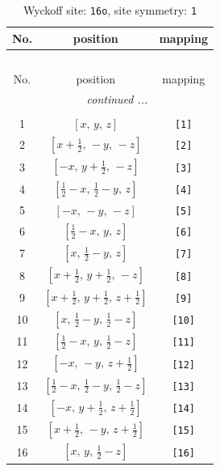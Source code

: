 \documentclass[fleqn,8pt]{jsarticle}
\begin{document}
\begin{longtable}{ccc}
\caption{Wyckoff site: {\tt 16o}, site symmetry: {\tt 1}}
 \\
 \hline \hline
No. & position & mapping \\ \hline \endfirsthead

\multicolumn{2}{l}{\tablename\ \thetable{}} \\
 \hline \hline
No. & position & mapping \\ \hline \endhead

 \hline \hline
\multicolumn{2}{r}{\footnotesize\it continued ...} \\ \endfoot

 \hline \hline
\multicolumn{2}{r}{} \\ \endlastfoot

1 & $\left[ x,\, y,\, z \right]$ & {\tt [1]} \\ \hline
2 & $\left[ x + \frac{1}{2},\, - y,\, - z \right]$ & {\tt [2]} \\ \hline
3 & $\left[ - x,\, y + \frac{1}{2},\, - z \right]$ & {\tt [3]} \\ \hline
4 & $\left[ \frac{1}{2} - x,\, \frac{1}{2} - y,\, z \right]$ & {\tt [4]} \\ \hline
5 & $\left[ - x,\, - y,\, - z \right]$ & {\tt [5]} \\ \hline
6 & $\left[ \frac{1}{2} - x,\, y,\, z \right]$ & {\tt [6]} \\ \hline
7 & $\left[ x,\, \frac{1}{2} - y,\, z \right]$ & {\tt [7]} \\ \hline
8 & $\left[ x + \frac{1}{2},\, y + \frac{1}{2},\, - z \right]$ & {\tt [8]} \\ \hline
9 & $\left[ x + \frac{1}{2},\, y + \frac{1}{2},\, z + \frac{1}{2} \right]$ & {\tt [9]} \\ \hline
10 & $\left[ x,\, \frac{1}{2} - y,\, \frac{1}{2} - z \right]$ & {\tt [10]} \\ \hline
11 & $\left[ \frac{1}{2} - x,\, y,\, \frac{1}{2} - z \right]$ & {\tt [11]} \\ \hline
12 & $\left[ - x,\, - y,\, z + \frac{1}{2} \right]$ & {\tt [12]} \\ \hline
13 & $\left[ \frac{1}{2} - x,\, \frac{1}{2} - y,\, \frac{1}{2} - z \right]$ & {\tt [13]} \\ \hline
14 & $\left[ - x,\, y + \frac{1}{2},\, z + \frac{1}{2} \right]$ & {\tt [14]} \\ \hline
15 & $\left[ x + \frac{1}{2},\, - y,\, z + \frac{1}{2} \right]$ & {\tt [15]} \\ \hline
16 & $\left[ x,\, y,\, \frac{1}{2} - z \right]$ & {\tt [16]} \\
\end{longtable}
\end{document}
